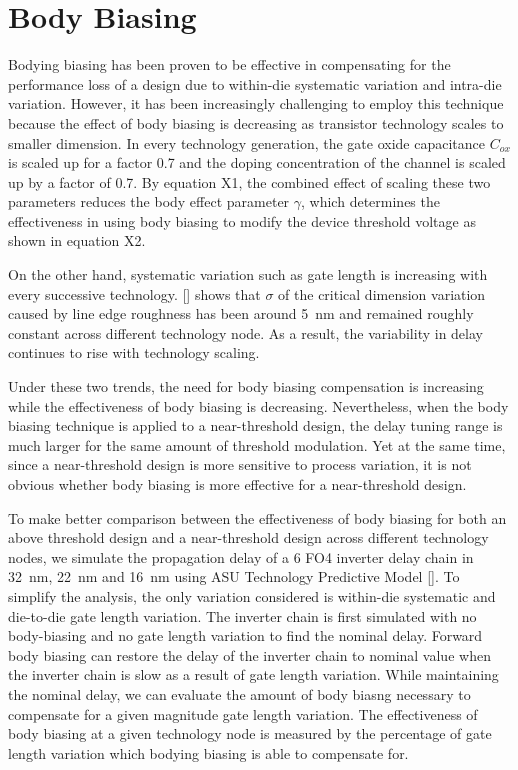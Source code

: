 \section{Body Biasing}
\label{sec:bodybiasing}

Bodying biasing has been proven to be effective in compensating for the
performance loss of a design due to within-die systematic variation and
intra-die variation. However, it has been increasingly challenging to employ
this technique because the effect of body biasing is decreasing as transistor
technology scales to smaller dimension. In every technology generation, the gate
oxide capacitance $C_{ox}$ is scaled up for a factor 0.7 and the doping
concentration of the channel is scaled up by a factor of 0.7. By equation X1,
the combined effect of scaling these two parameters reduces the body effect
parameter $\gamma$, which determines the effectiveness in using body biasing to
modify the device threshold voltage as shown in equation X2.

On the other hand, systematic variation such as gate length is increasing with
every successive technology. [] shows that $\sigma$ of the critical dimension
variation caused by line edge roughness has been around \SI{5}{\nano\meter} and
remained roughly constant across different technology node. As a result, the
variability in delay continues to rise with technology scaling. 

Under these two trends, the need for body biasing compensation is increasing
while the effectiveness of body biasing is decreasing. Nevertheless, when the
body biasing technique is applied to a near-threshold design, the delay tuning
range is much larger for the same amount of threshold modulation. Yet at the
same time, since a near-threshold design is more sensitive to process variation,
it is not obvious whether body biasing is more effective for a near-threshold
design. 

To make better comparison between the effectiveness of body biasing for both an
above threshold design and a near-threshold design across different technology
nodes,  we simulate the propagation  delay of a 6 FO4 inverter delay chain in
\SI{32}{\nano\meter}, \SI{22}{\nano\meter} and \SI{16}{\nano\meter} using ASU
Technology Predictive Model []. To simplify the analysis, the only variation
considered is within-die systematic and die-to-die gate length variation. The
inverter chain is first simulated with no body-biasing and no gate length
variation to find the nominal delay. Forward body biasing can restore the delay
of the inverter chain to nominal value when the inverter chain is slow as a
result of gate length variation. While maintaining the nominal delay, we can
evaluate the amount of body biasng necessary to compensate for a given magnitude
gate length variation. The effectiveness of body biasing at a given technology
node is measured by the percentage of gate length variation which bodying
biasing is able to compensate for. 

